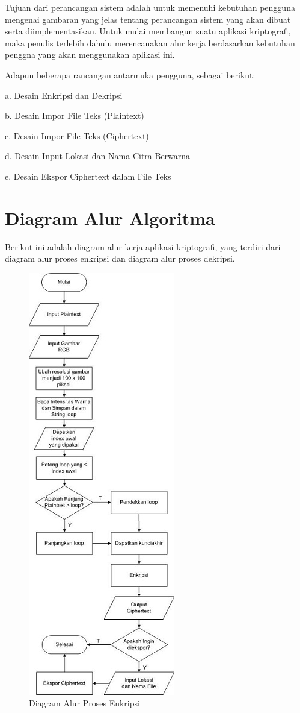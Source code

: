 \documentclass{jtetiproposalskripsi}
\begin{document}
Tujuan dari perancangan sistem adalah untuk memenuhi kebutuhan pengguna mengenai gambaran yang jelas tentang perancangan sistem yang akan dibuat serta diimplementasikan. Untuk mulai membangun suatu aplikasi kriptografi, maka penulis terlebih dahulu merencanakan alur kerja berdasarkan kebutuhan penggna yang akan menggunakan aplikasi ini. 

Adapun beberapa rancangan antarmuka pengguna, sebagai berikut:

a.	Desain Enkripsi dan Dekripsi

b.	Desain Impor File Teks (Plaintext)

c.	Desain Impor File Teks (Ciphertext)

d.	Desain Input Lokasi dan Nama Citra Berwarna

e.	Desain Ekspor Ciphertext dalam File Teks


\section{Diagram Alur Algoritma}
Berikut ini adalah diagram alur kerja aplikasi kriptografi, yang terdiri dari diagram alur proses enkripsi dan diagram alur proses dekripsi.
\begin{figure}[ht!]
  \centering
    \includegraphics{gambar/Enkripsi}
    \caption{Diagram Alur Proses Enkripsi}
    \label{Enkripsi}
\end{figure}
\end{document}
